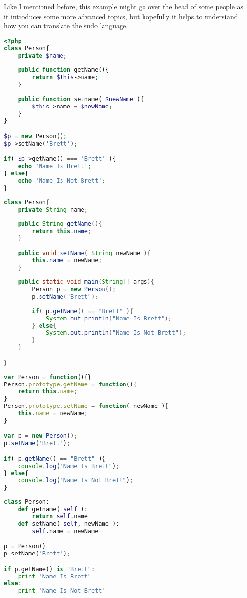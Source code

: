 Like I mentioned before, this example might go over the head of some people as it introduces some more advanced topics, but hopefully it
helps to understand how you can translate the sudo language.

\begin{lstlisting}[language=php,caption={Example 2 - PHP}]
<?php
class Person{
    private $name;
    
    public function getName(){
        return $this->name;
    }
    
    public function setname( $newName ){
        $this->name = $newName;
    }
}

$p = new Person();
$p->setName('Brett');

if( $p->getName() === 'Brett' ){
    echo 'Name Is Brett';
} else{
    echo 'Name Is Not Brett';
}
\end{lstlisting}

\begin{lstlisting}[language=java,caption={Eample 2 - Java}]
class Person{
    private String name;
    
    public String getName(){
        return this.name;
    }
    
    public void setName( String newName ){
        this.name = newName;
    }
    
    public static void main(String[] args){
        Person p = new Person();
        p.setName("Brett");
        
        if( p.getName() == "Brett" ){
            System.out.println("Name Is Brett");
        } else{
            System.out.println("Name Is Not Brett");
        }
    }

}
\end{lstlisting}

\begin{lstlisting}[language=javascript,caption={Example 2 - Node.JS}]
var Person = function(){}
Person.prototype.getName = function(){
    return this.name;
}
Person.prototype.setName = function( newName ){
    this.name = newName;
}

var p = new Person();
p.setName("Brett");

if( p.getName() == "Brett" ){
    console.log("Name Is Brett");
} else{
    console.log("Name Is Not Brett");
}
\end{lstlisting}

\begin{lstlisting}[language=python,caption={Example 2 - Python}]
class Person:
    def getname( self ):
        return self.name
    def setName( self, newName ):
        self.name = newName

p = Person()
p.setName("Brett");

if p.getName() is "Brett":
    print "Name Is Brett"
else:
    print "Name Is Not Brett"
\end{lstlisting}

